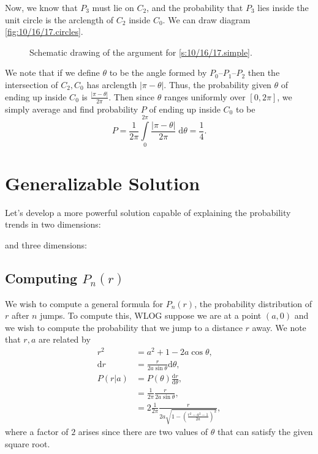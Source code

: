 \documentclass[12pt]{report}
\newcommand*{\rd}[2]{\frac{\mathrm{d}#1}{\mathrm{d}#2}}
\newcommand*{\abs}[1]{\left|#1\right|}
\begin{document}
Now, we know that $P_3$ must lie on $C_2$, and the
probability that $P_3$ lies inside the unit circle is the arclength of $C_2$
inside $C_0$. We can draw diagram \autoref{fig:10/16/17.circles}.
\begin{figure}[!h]
    \centering
    \caption{Schematic drawing of the argument for \autoref{s:10/16/17.simple}.}
\end{figure}\label{fig:10/16/17.circles}

We note that if we define $\theta$ to be the angle formed by $P_0$--$P_1$--$P_2$
then the intersection of $C_2, C_0$ has arclength $\abs{\pi - \theta}$. Thus,
the probability given $\theta$ of ending up inside $C_0$ is $\frac{\abs{\pi -
\theta}}{2\pi}$. Then since $\theta$ ranges uniformly over $[0, 2\pi]$, we
simply average and find probability $P$ of ending up inside $C_0$ to be
\begin{equation}
    P = \frac{1}{2\pi}\int\limits_{0}^{2\pi}\frac{\abs{\pi - \theta}}{2\pi}
        \;\mathrm{d}\theta
        = \frac{1}{4}.
\end{equation}

\section{Generalizable Solution}

Let's develop a more powerful solution capable of explaining the probability
trends in two dimensions:

and three dimensions:


\subsection{Computing $P_n(r)$}

We wish to compute a general formula for $P_n(r)$, the probability distribution
of $r$ after $n$ jumps. To compute this, WLOG suppose we are at a point $(a, 0)$
and we wish to compute the probability that we jump to a distance $r$ away. We
note that $r, a$ are related by
\begin{align}
    r^2 &= a^2 + 1 - 2a\cos\theta,\\
    \mathrm{d}r &= \frac{r}{2a\sin\theta}\mathrm{d}\theta,\\
    P(r|a) &= P(\theta)\rd{r}{\theta},\nonumber\\
        &= \frac{1}{2\pi} \frac{r}{2a\sin\theta},\nonumber\\
        & = 2\frac{1}{2\pi}\frac{r}{2a\sqrt{1 - \left(
            \frac{r^2 - a^2 - 1}{2a}
        \right)^2}},\label{eq:10/16/17.sol}
\end{align}
where a factor of $2$ arises since there are two values of $\theta$ that can
satisfy the given square root.
\end{document}
